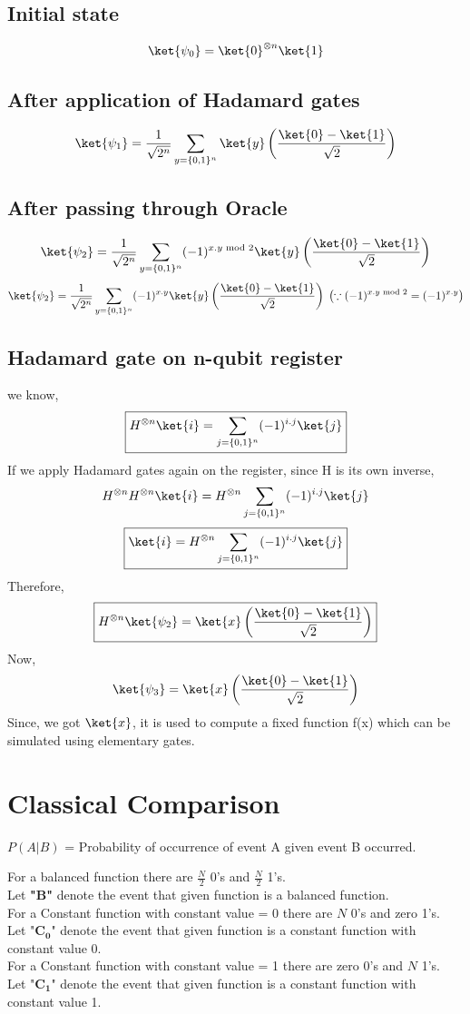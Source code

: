 \documentclass[11pt, a4paper]{article}
\begin{document}
\subsection{Initial state}
\[
    \ket{\psi_0} = \ket{0}^{\otimes n}\ket{1}
\]
\subsection{After application of Hadamard gates}
\[
    \ket{\psi_1} = \frac{1}{\sqrt{2^{n}} }\sum\limits_{y=\{0,1\}^n} \ket{y}\left(\frac{\ket{0}-\ket{1}}{\sqrt{2} }\right)
\]
\subsection{After passing through Oracle}
\[
    \ket{\psi_2} = \frac{1}{\sqrt{2^n}} \sum\limits_{y=\{0,1\}^n} (-1)^{x.y \text{ mod }2}\ket{y}\left(\frac{\ket{0}-\ket{1}}{\sqrt{2} }\right)
\]
\[
    \ket{\psi_2} = \frac{1}{\sqrt{2^n}} \sum\limits_{y=\{0,1\}^n} (-1)^{x . y}\ket{y}\left(\frac{\ket{0}-\ket{1}}{\sqrt{2} }\right) \; \left(\because (-1)^{x . y\text{ mod }2 }= (-1)^{x.y}\right)
\]
\subsection{Hadamard gate on n-qubit register }
we know, 
\[
    \boxed{H^{\otimes n}\ket{i} = \sum\limits_{j=\{0,1\}^n} (-1)^{i.j} \ket{j} }
\]
If we apply Hadamard gates again on the register, since H is its own inverse,
\[
    H^{\otimes n}H^{\otimes n}\ket{i} = H^{\otimes n}\sum\limits_{j=\{0,1\}^n} (-1)^{i.j} \ket{j} 
\]
\[
    \boxed{\ket{i} = H^{\otimes n}\sum\limits_{j=\{0,1\}^n} (-1)^{i.j} \ket{j}}
\]
Therefore, 
\[
    \boxed{H^{\otimes n} \ket{\psi_2} = \ket{x}\left(\frac{\ket{0}-\ket{1}}{\sqrt{2} }\right) }
\]
Now, 
\[  
\ket{\psi_3} = \ket{x}\left(\frac{\ket{0}-\ket{1}}{\sqrt{2} }\right)
\]
Since, we got \(\ket{x}\), it is used to compute a fixed function f(x) which can be simulated using elementary gates. 

\section{Classical Comparison}

\( P(A|B) \) = Probability of occurrence of event A given event B occurred.

\noindent For a balanced function there are \(\frac{N}{2}\) 0's and \(\frac{N}{2}\) 1's. \\ \indent Let \textbf{"B"} denote the event that given function is a balanced function.\\ 
For a Constant function with constant value = 0 there are \(N\) 0's and zero 1's. 
\\\indent Let "\({\mathbf{C_0} } \)" denote the event that given function is a constant function with constant value 0.\\
For a Constant function with constant value = 1 there are zero 0's and \(N\)  1's. 
\\\indent Let "\({\mathbf{C_{1} } } \)" denote the event that given function is a constant function with constant value 1. 
\end{document}
